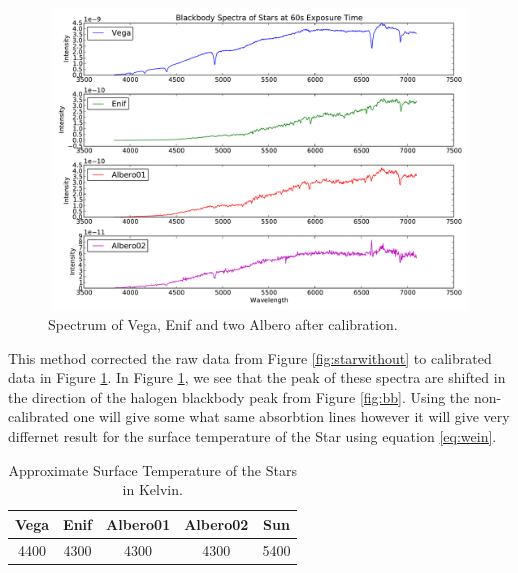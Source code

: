 \documentclass[a4paper,12pt]{article}
\begin{document}
\begin{figure}[H]
\centering
\includegraphics[angle=0,height=8cm,width=12cm]{graphs/Star.pdf}
\caption{Spectrum of Vega, Enif and two Albero after calibration.}
\label{fig:star}
\end{figure}
This method corrected the raw data from Figure \ref{fig:starwithout} to calibrated data in Figure \ref{fig:star}. In Figure \ref{fig:star}, we see that the peak of these spectra are shifted in the direction of the halogen blackbody peak from Figure \ref{fig:bb}. Using the non-calibrated one will give some what same absorbtion lines however it will give very differnet result for the surface temperature of the Star using equation \ref{eq:wein}.
\begin{table}[H]
\centering %
\caption{Approximate Surface Temperature of the Stars in Kelvin.}
\footnotesize

\begin{tabular}{ccccc}%
\hline
\hline
Vega & Enif & Albero01 & Albero02 & Sun \\
\hline
4400   &    4300   &    4300 & 4300&5400\\
\hline
\hline

\end{tabular}
\label{table:blackbody} %
\end{table}
\end{document}
